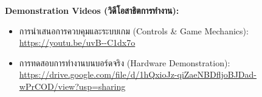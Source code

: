 \noindent\textbf{Demonstration Videos (วิดีโอสาธิตการทำงาน):}
\begin{itemize}[leftmargin=1.5cm]
    \item การนำเสนอการควบคุมและระบบเกม (Controls \& Game Mechanics): \\ \url{https://youtu.be/uvB--C1dx7o}
    \item การทดสอบการทำงานบนบอร์ดจริง (Hardware Demonstration): \\ \url{https://drive.google.com/file/d/1hQxioJz-qiZaeNBDfljoBJDad-wPrCOD/view?usp=sharing}
\end{itemize}
